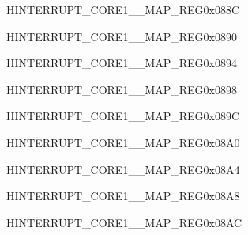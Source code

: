 \begin{register}{H}{INTERRUPT\_CORE1\_\_MAP\_REG}{0x088C}\label{regdesc:INTERRUPTCORE1LEDCINTMAPREG}
\end{register}
\vspace{-3em}

\begin{register}{H}{INTERRUPT\_CORE1\_\_MAP\_REG}{0x0890}\label{regdesc:INTERRUPTCORE1EFUSEINTMAPREG}
\end{register}
\vspace{-3em}

\begin{register}{H}{INTERRUPT\_CORE1\_\_MAP\_REG}{0x0894}\label{regdesc:INTERRUPTCORE1TWAIINTMAPREG}
\end{register}
\vspace{-3em}

\begin{register}{H}{INTERRUPT\_CORE1\_\_MAP\_REG}{0x0898}\label{regdesc:INTERRUPTCORE1USBINTRMAPREG}
\end{register}
\vspace{-3em}

\begin{register}{H}{INTERRUPT\_CORE1\_\_MAP\_REG}{0x089C}\label{regdesc:INTERRUPTCORE1RTCCOREINTRMAPREG}
\end{register}
\vspace{-3em}

\begin{register}{H}{INTERRUPT\_CORE1\_\_MAP\_REG}{0x08A0}\label{regdesc:INTERRUPTCORE1RMTINTRMAPREG}
\end{register}
\vspace{-3em}

\begin{register}{H}{INTERRUPT\_CORE1\_\_MAP\_REG}{0x08A4}\label{regdesc:INTERRUPTCORE1PCNTINTRMAPREG}
\end{register}
\vspace{-3em}

\begin{register}{H}{INTERRUPT\_CORE1\_\_MAP\_REG}{0x08A8}\label{regdesc:INTERRUPTCORE1I2CEXT0INTRMAPREG}
\end{register}
\vspace{-3em}

\begin{register}{H}{INTERRUPT\_CORE1\_\_MAP\_REG}{0x08AC}\label{regdesc:INTERRUPTCORE1I2CEXT1INTRMAPREG}
\end{register}
\vspace{-3em}

